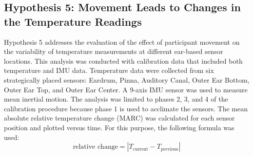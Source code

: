 \subsection{Hypothesis 5: Movement Leads to Changes in the Temperature Readings}
\label{subsec:Evaluation:Study1:Hypothesis5}

Hypothesis 5 addresses the evaluation of the effect of participant movement on the variability of temperature measurements at different ear-based sensor locations.
This analysis was conducted with calibration data that included both temperature and IMU data. 
Temperature data were collected from six strategically placed sensors: Eardrum, Pinna, Auditory Canal, Outer Ear Bottom, Outer Ear Top, and Outer Ear Center.
A 9-axis IMU sensor was used to measure mean inertial motion. 
The analysis was limited to phases 2, 3, and 4 of the calibration procedure because phase 1 is used to acclimate the sensors.
The mean absolute relative temperature change (MARC) was calculated for each sensor position and plotted versus time.
For this purpose, the following formula was used:
\[
\text{relative change} = \left| T_{\text{current}} - T_{\text{previous}} \right|
\]


